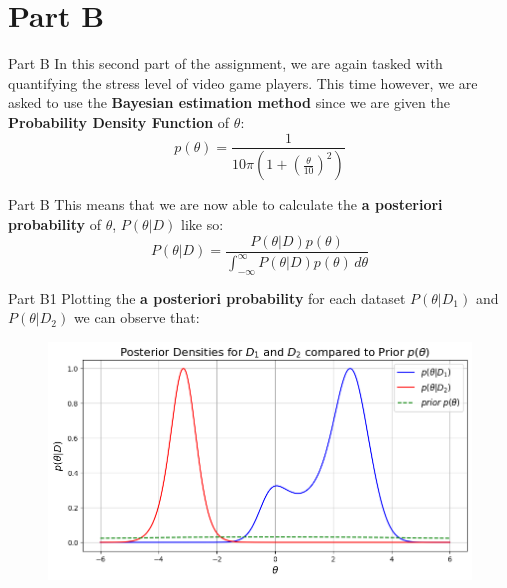 \documentclass{beamer}
\begin{document}
\section{Part B}
    \begin{frame}{Part B}    
    In this second part of the assignment, we are again tasked with quantifying the stress level of video game players. This time however, we are asked to use the \textbf{Bayesian estimation method} since we are given the \textbf{Probability Density Function} of $\theta$:
    $$
    p(\theta) = \frac{1}{10\pi \left( 1 + \left(\frac{\theta}{10}\right)^2 \right)}
    $$
    \end{frame}

    \begin{frame}{Part B}
    This means that we are now able to calculate the \textbf{a posteriori probability} of $\theta$, $P(\theta|D)$ like so:
    $$
    P(\theta|D)=\frac{P(\theta|D)p(\theta)}{\int_{-\infty}^{\infty} P(\theta|D)p(\theta) \, d\theta}
    $$
    \end{frame}

    \begin{frame}{Part B1}
    Plotting the \textbf{a posteriori probability} for each dataset \textbf{$P(\theta|D_1)$} and \textbf{$P(\theta|D_2)$} we can observe that:
    \begin{figure}
        \centering
        \includegraphics[width=1\linewidth]{B1.png}
        \label{Graph B1}
    \end{figure}
    \end{frame}
\end{document}
